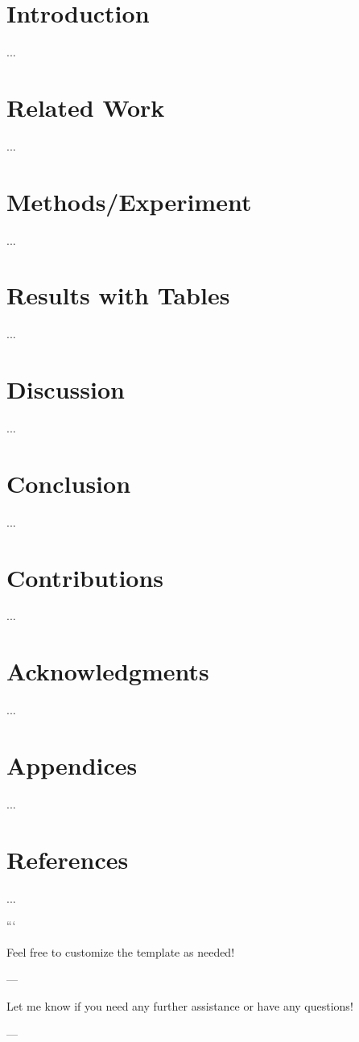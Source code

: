 \section{Introduction}
...

\section{Related Work}
...

\section{Methods/Experiment}
...

\section{Results with Tables}
...

\section{Discussion}
...

\section{Conclusion}
...

\section{Contributions}
...

\section{Acknowledgments}
...

\section{Appendices}
...

\section{References}
...


```

Feel free to customize the template as needed! 

--- 

Let me know if you need any further assistance or have any questions! 

--- 

